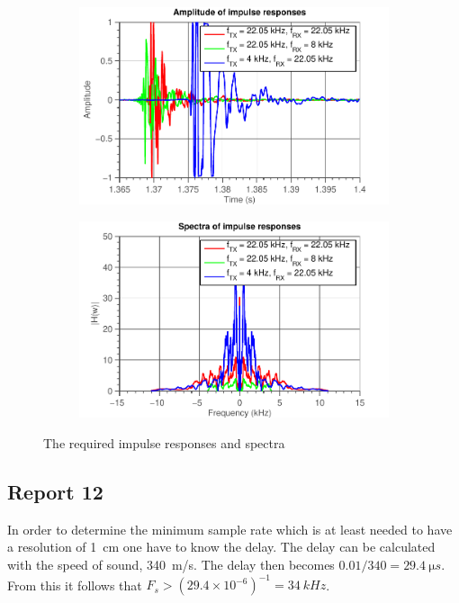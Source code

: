 \documentclass[11pt,titlepage]{report}
\begin{document}
\begin{figure}[H]
	\centering
	\begin{subfigure}{0.49\textwidth}
		\includegraphics[width=\textwidth]{../../deliverable-7-resources/figures/ass-1/report-11-12-13/ass-1-report-11-time.pdf}
	\end{subfigure}
	\begin{subfigure}{0.49\textwidth}
		\includegraphics[width=\textwidth]{../../deliverable-7-resources/figures/ass-1/report-11-12-13/ass-1-report-11.pdf}
	\end{subfigure}
	\caption{The required impulse responses and spectra}
	\label{fig:rep11-impulse-spectra}
\end{figure}



\subsection{Report 12}
In order to determine the minimum sample rate which is at least needed to have a resolution of \SI{1}{cm} one have to know the delay. The delay can be calculated with the speed of sound, \SI{340}{m/s}. The delay then becomes $0.01/340 = \SI{29.4}{\micro s}$. From this it follows that $F_s > (29.4 \times 10^{-6})^{-1} = \SI{34}{kHz}$. 
\end{document}
